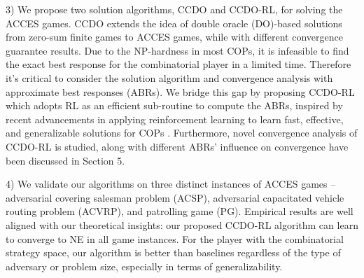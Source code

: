 3) We propose two solution algorithms, CCDO and CCDO-RL, for solving the ACCES games. CCDO extends the idea of double oracle (DO)-based solutions from zero-sum finite games \citep{mcmahan2003planning} to ACCES games, while with different convergence guarantee results. Due to the NP-hardness in most COPs, it is infeasible to find the exact best response for the combinatorial player in a limited time. Therefore it's critical to consider the solution algorithm and convergence analysis with approximate best responses (ABRs). We bridge this gap by proposing CCDO-RL which adopts RL as an efficient sub-routine to compute the ABRs, inspired by recent advancements in applying reinforcement learning to learn fast, effective, and generalizable solutions for COPs \citep{khalil2017learning,nazari2018reinforcement,deudon2018learning,bengio2020machine,Chen2021rl4im,berto2023rl4co}. Furthermore, novel convergence analysis of CCDO-RL is studied, along with different ABRs' influence on convergence have been discussed in Section 5. 


4) We validate our algorithms on three distinct instances of ACCES games -- adversarial covering salesman problem (ACSP), adversarial capacitated vehicle routing problem (ACVRP), and patrolling game (PG). Empirical results are well aligned with our theoretical insights: our proposed CCDO-RL algorithm can learn to converge to NE in all game instances. For the player with the combinatorial strategy space, our algorithm is better than baselines regardless of the type of adversary or problem size, especially in terms of generalizability.

